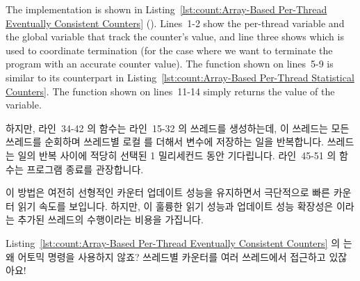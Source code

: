 The implementation is shown in
Listing~\ref{lst:count:Array-Based Per-Thread Eventually Consistent Counters}
().
Lines~1-2 show the per-thread variable and the global variable that
track the counter's value, and line three shows 
which is used to coordinate termination (for the case where we want
to terminate the program with an accurate counter value).
The  function shown on lines~5-9 is similar to its
counterpart in
Listing~\ref{lst:count:Array-Based Per-Thread Statistical Counters}.
The  function shown on lines~11-14 simply returns the
value of the  variable.
\fi

하지만, 라인~34-42 의  함수는 라인~15-32 의 
쓰레드를 생성하는데, 이 쓰레드는 모든 쓰레드를 순회하며 쓰레드별 로컬
 를 더해서  변수에 저장하는 일을 반복합니다.
 쓰레드는 일의 반복 사이에 적당히 선택된 1 밀리세컨드 동안
기다립니다.
라인~45-51 의  함수는 프로그램 종료를 관장합니다.

이 방법은 여전히 선형적인 카운터 업데이트 성능을 유지하면서 극단적으로 빠른
카운터 읽기 속도를 보입니다.
하지만, 이 훌륭한 읽기 성능과 업데이트 성능 확장성은  이라는
추가된 쓰레드의 수행이라는 비용을 가집니다.

\QuickQuiz{}
	Listing~\ref{lst:count:Array-Based Per-Thread Eventually Consistent
	Counters} 의  는 왜 어토믹 명령을 사용하지 않죠?
	쓰레드별 카운터를 여러 쓰레드에서 접근하고 있잖아요!
	\iffalse


